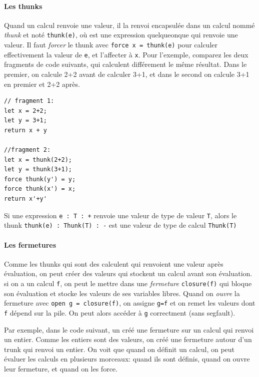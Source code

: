 \documentclass[12pt]{article}
\begin{document}
\hypertarget{les-thunks}{%
      \paragraph*{Les thunks}\label{les-thunks}}

Quand un calcul renvoie une valeur, il la renvoi encapsulée dans un
calcul nommé \emph{thunk} et noté \texttt{thunk(e)}, où est une
expression quelqueonque qui renvoie une valeur. Il faut \emph{forcer} le
thunk avec \texttt{force\ x\ =\ thunk(e)} pour calculer effectivement la
valeur de \texttt{e}, et l'affecter à \texttt{x}. Pour l'exemple,
comparez les deux fragments de code suivants, qui calculent différement
le même résultat. Dans le premier, on calcule 2+2 avant de calculer 3+1,
et dans le second on calcule 3+1 en premier et 2+2 après.

\begin{verbatim}
// fragment 1:
let x = 2+2;
let y = 3+1;
return x + y 
  
//fragment 2:
let x = thunk(2+2);
let y = thunk(3+1);
force thunk(y') = y;
force thunk(x') = x;
return x'+y'
\end{verbatim}

Si une expression \texttt{e\ :\ T\ :\ +} renvoie une valeur de type de
valeur \texttt{T}, alors le thunk \texttt{thunk(e)\ :\ Thunk(T)\ :\ -}
est une valeur de type de calcul \texttt{Thunk(T)}

\hypertarget{les-fermetures}{%
      \paragraph*{Les fermetures}\label{les-fermetures}}

Comme les thunks qui sont des calculent qui renvoient une valeur après
évaluation, on peut créer des valeurs qui stockent un calcul avant son
évaluation. si on a un calcul \texttt{f}, on peut le mettre dans une
\emph{fermeture} \texttt{closure(f)} qui bloque son évaluation et stocke
les valeurs de ses variables libres. Quand on \emph{ouvre} la fermeture
avec \texttt{open\ g\ =\ closure(f)}, on assigne \texttt{g=f} et on
remet les valeurs dont \texttt{f} dépend sur la pile. On peut alors
accéder à \texttt{g} correctment (sans segfault).

Par exemple, dans le code suivant, un créé une fermeture sur un calcul
qui renvoi un entier. Comme les entiers sont des valeurs, on créé une
fermeture autour d'un trunk qui renvoi un entier. On voit que quand on
définit un calcul, on peut évaluer les calculs en plusieurs morceaux:
quand ils sont définis, quand on ouvre leur fermeture, et quand on les
force.
\end{document}
